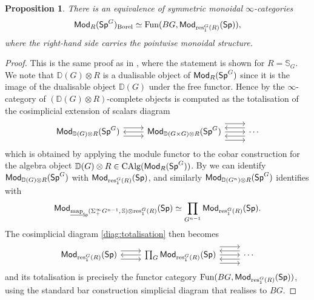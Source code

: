 \documentclass[reqno]{amsart}
\numberwithin{equation}{section}\theoremstyle{thms}
\newtheorem{prop}[equation]{Proposition}
\theoremstyle{defn}
\newcommand{\bD}{\mathbb{D}}
\newcommand{\bS}{\mathbb{S}}
\newcommand{\tn}[1]{\textnormal{#1}}
\newcommand{\tsf}[1]{\textsf{\textup{#1}}}
\newcommand{\underl}[1]{\underline{#1}}
\newcommand{\fun}{\tn{Fun}}
\newcommand{\imap}{\underl{\tn{map}}}
\newcommand{\calg}{\tn{CAlg}}
\newcommand{\Mod}{\tsf{Mod}}
\newcommand{\spec}{\tsf{Sp}}
\newcommand{\specg}{\tsf{Sp}^G}
\begin{document}
\begin{prop}\label{prop:borelcompleteasfun}
There is an equivalence of symmetric monoidal $\infty$-categories $$\Mod_R(\specg)_{\tn{Borel}} \simeq \fun(BG,\Mod_{\tn{res}^G_1(R)}(\spec)),$$
where the right-hand side carries the pointwise monoidal structure.
\end{prop}
\begin{proof}
This is the same proof as in \cite[Proposition 6.17]{mnn17}, where the statement is shown for $R = \bS_G$. We note that $\bD(G) \otimes R$ is a dualisable object of $\Mod_R(\specg)$ since it is the image of the dualisable object $\bD(G)$ under the free functor. Hence by \cite[Theorem 2.30]{mnn17} the $\infty$-category of $(\bD(G) \otimes R)$-complete objects is computed as the totalisation of the cosimplicial extension of scalars diagram
\begin{equation}\label{diag:totalisation}
\begin{tikzcd}
	{\Mod_{\bD(G)\otimes R}(\specg)} & {\Mod_{\bD(G \times G) \otimes R}(\specg)} & {\cdots}
	\arrow[shift right=2, from=1-1, to=1-2]
	\arrow[shift left=2, from=1-1, to=1-2]
	\arrow[from=1-2, to=1-1]
	\arrow[from=1-2, to=1-3]
	\arrow[shift left=4, from=1-2, to=1-3]
	\arrow[shift right=4, from=1-2, to=1-3]
	\arrow[shift right=2, from=1-3, to=1-2]
	\arrow[shift left=2, from=1-3, to=1-2]
\end{tikzcd}
\end{equation}
which is obtained by applying the module functor to the cobar construction for the algebra object $\bD(G) \otimes R \in \calg(\Mod_R(\specg))$. By  we can identify $\Mod_{\bD(G)\otimes R}(\specg)$ with $\Mod_{\tn{res}^G_1(R)}(\spec)$, and similarly $\Mod_{\bD(G^n)\otimes R}(\specg)$ identifies with 
$$\Mod_{\imap_{\spec}(\Sigma^{\infty}_+G^{n-1}, \,\bS) \otimes \tn{res}^G_1(R)}(\spec) \simeq \prod_{G^{n-1}} \Mod_{\tn{res}^G_1(R)}(\spec).$$
The cosimplicial diagram \ref{diag:totalisation} then becomes
\[\begin{tikzcd}
	{\Mod_{\tn{res}^G_1(R)}(\spec)} & {\prod_{G} \Mod_{\tn{res}^G_1(R)}(\spec)} & \cdots
	\arrow[shift right=2, from=1-1, to=1-2]
	\arrow[shift left=2, from=1-1, to=1-2]
	\arrow[from=1-2, to=1-1]
	\arrow[from=1-2, to=1-3]
	\arrow[shift left=4, from=1-2, to=1-3]
	\arrow[shift right=4, from=1-2, to=1-3]
	\arrow[shift right=2, from=1-3, to=1-2]
	\arrow[shift left=2, from=1-3, to=1-2]
\end{tikzcd}\]
and its totalisation is precisely the functor category $\fun(BG,\Mod_{\tn{res}^G_1(R)}(\spec))$, using the standard bar construction simplicial diagram that realises to $BG$. 
\end{proof}
\end{document}
